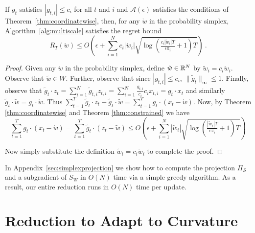 \documentclass[12pt]{colt2018} %
\newcommand{\ol}{\mathcal{A}}
\newcommand{\w}{\mathring{w}}
\begin{document}
\begin{theorem}\label{thm:multiscale}
If $g_t$ satisfies $|g_{t,i}|\le c_i$ for all $t$ and $i$ and $\ol(\epsilon)$ satisfies the conditions of Theorem~\ref{thm:coordinatewise},
then, for any $\w$ in the probability simplex, Algorithm~\ref{alg:multiscale} satisfies the regret bound
\[
R_T(\w) \le O\left(\epsilon + \sum_{i=1}^N c_i|\w_i|\sqrt{\log\left(\tfrac{c_i|\w_i|T}{\epsilon\pi_i}+1\right)T}\right)~.
\]
\end{theorem}
\begin{proof}
Given any $\w$ in the probability simplex, define $\tilde w\in \mathbb{R}^N$ by $\tilde w_i = c_i\w_i$. Observe that $\tilde w\in W$. Further, observe that since $|g_{t,i}|\le c_i$, $\|\tilde g_t\|_\infty \le 1$. Finally, observe that $\tilde g_t\cdot z_t =\sum_{i=1}^N \tilde g_{t,i} z_{t,i}=\sum_{i=1}^N \tfrac{g_{t,i}}{c_i} c_ix_{t,i} = g_t\cdot x_t$ and similarly $\tilde g_t\cdot \tilde w = g_t\cdot \w$. Thus $\sum_{t=1}^T \tilde g_t\cdot z_t-\tilde g_t\cdot \tilde w=\sum_{t=1}^T g_t\cdot(x_t-\w)$. Now, by Theorem \ref{thm:coordinatewise} and Theorem \ref{thm:constrained} we have
\[
\sum_{t=1}^T g_t\cdot(x_t-\w)=\sum_{t=1}^T \tilde g_t\cdot (z_t- \tilde w)
\le O\left(\epsilon + \sum_{i=1}^N |\tilde w_i|\sqrt{\log\left(\tfrac{|\tilde w_i|T}{\epsilon\pi_i}+1\right)T}\right)
\]

Now simply substitute the definition $\tilde w_i = c_i\w_i$ to complete the proof.
\end{proof}

In Appendix~\ref{sec:simplexprojection} we show how to compute the projection $\Pi_S$ and a subgradient of $S_W$ in $O(N)$ time via a simple greedy algorithm. As a result, our entire reduction runs in $O(N)$ time per update.


\section{Reduction to Adapt to Curvature}\label{sec:metagrad}
\end{document}

